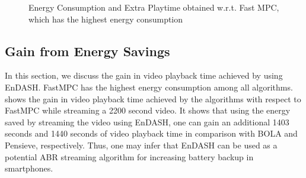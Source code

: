 \begin{figure}[ht]%
	\centering
	{}	
	\caption{Energy Consumption and Extra Playtime obtained w.r.t. Fast MPC, which has the highest energy consumption}\vspace*{-0.5cm}
	\label{fig:chap04:vid_time_save}
\end{figure}
\subsection{Gain from Energy Savings}
\indent In this section, we discuss the gain in video playback time achieved by using EnDASH. FastMPC has the highest energy consumption among all algorithms. \fig{\ref{fig:chap04:vid_time_save}} shows the gain in video playback time achieved by the algorithms with respect to FastMPC while streaming a 2200 second video. It shows that using the energy saved by streaming the video using EnDASH, one can gain an additional 1403 seconds and 1440 seconds of video playback time in comparison with BOLA and Pensieve, respectively. Thus, one may infer that EnDASH can be used as a potential ABR streaming algorithm for increasing battery backup in smartphones.

